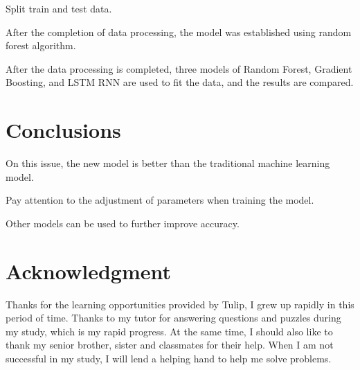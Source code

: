 Split train and test data.

After the completion of data processing, the model was established using random forest algorithm.

After the data processing is completed, three models of Random Forest, Gradient Boosting, 
and LSTM RNN are used to fit the data, and the results are compared.





\section{Conclusions} \label{sec-conclusions}

On this issue, the new model is better than the traditional machine learning model.

Pay attention to the adjustment of parameters when training the model.

Other models can be used to further improve accuracy.


\section*{Acknowledgment}

Thanks for the learning opportunities provided by Tulip, 
I grew up rapidly in this period of time. 
Thanks to my tutor for answering questions and puzzles during my study, 
which is my rapid progress. At the same time, I should also like to thank my senior brother, 
sister and classmates for their help. When I am not successful in my study, 
I will lend a helping hand to help me solve problems.


